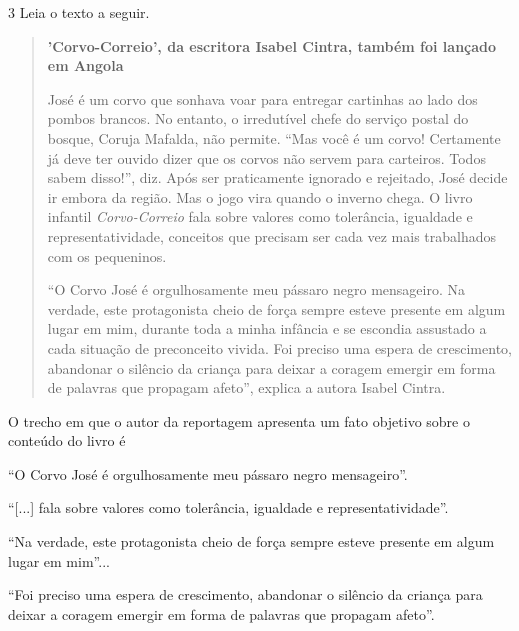 \num{3} Leia o texto a seguir.

\begin{quote}
\textbf{'Corvo-Correio', da escritora Isabel Cintra, também foi lançado 
em Angola}

José é um corvo que sonhava voar para entregar cartinhas ao lado dos
pombos brancos. No entanto, o irredutível chefe do serviço postal do
bosque, Coruja Mafalda, não permite. ``Mas você é um corvo! Certamente já
deve ter ouvido dizer que os corvos não servem para carteiros. Todos
sabem disso!'', diz. Após ser praticamente ignorado e rejeitado, José
decide ir embora da região. Mas o jogo vira quando o inverno chega. O
livro infantil \textit{Corvo-Correio} fala sobre valores como tolerância,
igualdade e representatividade, conceitos que precisam ser cada vez mais
trabalhados com os pequeninos.

``O Corvo José é orgulhosamente meu pássaro negro mensageiro. Na
verdade, este protagonista cheio de força sempre esteve presente em
algum lugar em mim, durante toda a minha infância e se escondia
assustado a cada situação de preconceito vivida. Foi preciso uma espera
de crescimento, abandonar o silêncio da criança para deixar a coragem
emergir em forma de palavras que propagam afeto'', explica a autora
Isabel Cintra.

\end{quote}

O trecho em que o autor da reportagem apresenta um fato objetivo sobre
o conteúdo do livro é

\begin{escolha}
\item ``O Corvo José é orgulhosamente meu pássaro negro mensageiro''.

\item ``{[}...{]} fala sobre
valores como tolerância, igualdade e representatividade''.

\item ``Na verdade, este protagonista cheio de força sempre esteve
presente em algum lugar em mim''...

\item ``Foi preciso uma espera de crescimento, abandonar o silêncio da
criança para deixar a coragem emergir em forma de palavras que propagam
afeto''.
\end{escolha}

